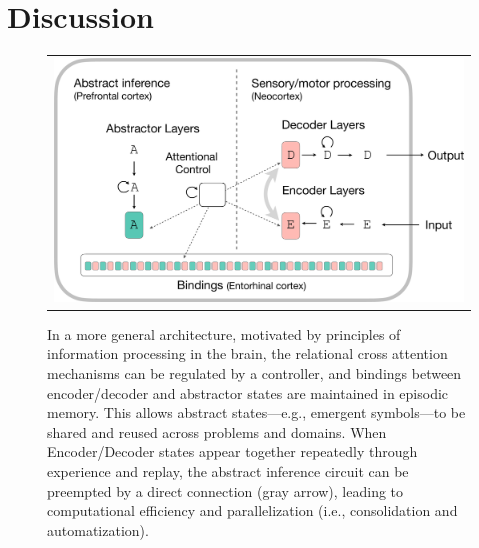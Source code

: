 \section{Discussion}
\label{sec:discuss}

\begin{figure}[t]
    \vspace{-3mm}
    \begin{center}
    \begin{tabular}{c}
        \hskip2pt\includegraphics[width=.60\textwidth]{figures/algorithm-diagram2-crop} 
    \end{tabular}
    \caption{In a more general architecture, motivated by principles of information processing 
    in the brain, the relational cross attention mechanisms can be regulated by a controller, and bindings between encoder/decoder and abstractor states are maintained in episodic memory. This allows abstract states---e.g., emergent symbols---to be shared and reused across problems and domains. When Encoder/Decoder states appear together repeatedly through experience and replay, the abstract inference circuit can be preempted by a direct connection (gray arrow), leading to computational efficiency and parallelization (i.e., consolidation and automatization).
    }
    \label{fig:algo2}
    \vskip-12pt
    \end{center}
\end{figure}